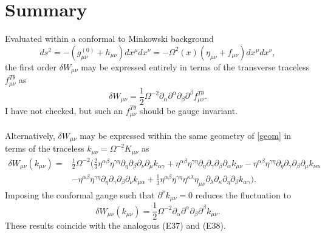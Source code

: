 \documentclass[10pt,letterpaper]{article}
\begin{document}
\section*{Summary}
Evaluated within a conformal to Minkowski background 
\begin{equation}
ds^2 = -(g_{\mu\nu}^{(0)} + h_{\mu\nu})dx^\mu dx^\nu = -\Omega^2(x)(\eta_{\mu\nu} + f_{\mu\nu}) dx^\mu dx^\nu\label{geom}, 
\end{equation}
the first order $\delta W_{\mu\nu}$ may be expressed entirely in terms of the transverse traceless $f_{\mu\nu}^{T\theta}$ as
\begin{equation}
\delta W_{\mu\nu} = \frac12 \Omega^{-2} \partial_\alpha\partial^\alpha\partial_\beta \partial^\beta f^{T\theta}_{\mu\nu}.
\end{equation}
I have not checked, but such an $f^{T\theta}_{\mu\nu}$ should be gauge invariant.
\\ \\
Alternatively, $\delta W_{\mu\nu}$ may be expressed within the same geometry of \eqref{geom} in terms of the traceless $k_{\mu\nu} = \Omega^{-2} K_{\mu\nu}$ as
\begin{align}
\delta W_{\mu\nu}(k_{\mu\nu}) ={}&\frac12 \Omega^{-2}\bigg(\frac{2}{3} \eta^{\alpha \beta} \eta^{\gamma \eta}  \partial_{\eta}\partial_{\beta}\partial_{\nu}\partial_{\mu}k_{\alpha \gamma}
 + \eta^{\alpha \beta} \eta^{\gamma \eta}  \partial_{\eta}\partial_{\gamma}\partial_{\beta}\partial_{\alpha}k_{\mu \nu}
 -  \eta^{\alpha \beta} \eta^{\gamma \eta}  \partial_{\eta}\partial_{\gamma}\partial_{\beta}\partial_{\mu}k_{\nu \alpha}\nonumber\\
& -  \eta^{\alpha \beta} \eta^{\gamma \eta}  \partial_{\eta}\partial_{\gamma}\partial_{\beta}\partial_{\nu}k_{\mu \alpha}
 + \frac{1}{3} \eta^{\alpha \beta} \eta^{\gamma \eta} \eta^{\kappa \lambda} \eta_{\mu \nu} \partial_{\lambda}\partial_{\kappa}\partial_{\eta}\partial_{\beta}k_{\alpha \gamma}\bigg).
\end{align}
Imposing the conformal gauge such that $\partial^\nu k_{\mu\nu} = 0$ reduces the fluctuation to 
\begin{equation}
\delta W_{\mu\nu}(k_{\mu\nu}) =\frac12 \Omega^{-2} \partial_\alpha\partial^\alpha\partial_\beta \partial^\beta k_{\mu\nu}.
\end{equation}
These results coincide with the analogous (E37) and (E38). 
\end{document}
